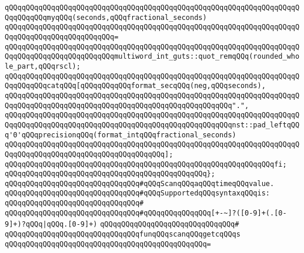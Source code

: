 \newline
\verb|qQQqqQQqqQQqqQQqqQQqqQQqqQQqqQQqqQQqqQQqqQQqqQQqqQQqqQQqqQQqqQQqqQQqqQQqqQQqqQQqmyqQQq(seconds,qQQqfractional_seconds)|\newline
\verb|qQQqqQQqqQQqqQQqqQQqqQQqqQQqqQQqqQQqqQQqqQQqqQQqqQQqqQQqqQQqqQQqqQQqqQQqqQQqqQQqqQQqqQQqqQQqqQQq=|\newline
\verb|qQQqqQQqqQQqqQQqqQQqqQQqqQQqqQQqqQQqqQQqqQQqqQQqqQQqqQQqqQQqqQQqqQQqqQQqqQQqqQQqqQQqqQQqqQQqqQQqmultiword_int_guts::quot_remqQQq(rounded_whole_part,qQQqrscl);|\newline
\newline
\verb|qQQqqQQqqQQqqQQqqQQqqQQqqQQqqQQqqQQqqQQqqQQqqQQqqQQqqQQqqQQqqQQqqQQqqQQqqQQqqQQqcatqQQq[qQQqqQQqqQQqformat_secqQQq(neg,qQQqseconds),|\newline
\verb|qQQqqQQqqQQqqQQqqQQqqQQqqQQqqQQqqQQqqQQqqQQqqQQqqQQqqQQqqQQqqQQqqQQqqQQqqQQqqQQqqQQqqQQqqQQqqQQqqQQqqQQqqQQqqQQqqQQqqQQqqQQq".",|\newline
\verb|qQQqqQQqqQQqqQQqqQQqqQQqqQQqqQQqqQQqqQQqqQQqqQQqqQQqqQQqqQQqqQQqqQQqqQQqqQQqqQQqqQQqqQQqqQQqqQQqqQQqqQQqqQQqqQQqqQQqqQQqqQQqnst::pad_leftqQQq'0'qQQqprecisionqQQq(format_intqQQqfractional_seconds)|\newline
\verb|qQQqqQQqqQQqqQQqqQQqqQQqqQQqqQQqqQQqqQQqqQQqqQQqqQQqqQQqqQQqqQQqqQQqqQQqqQQqqQQqqQQqqQQqqQQqqQQqqQQqqQQqqQQq];|\newline
\verb|qQQqqQQqqQQqqQQqqQQqqQQqqQQqqQQqqQQqqQQqqQQqqQQqqQQqqQQqqQQqqQQqfi;|\newline
\newline
\verb|qQQqqQQqqQQqqQQqqQQqqQQqqQQqqQQqqQQqqQQqqQQqqQQq};|\newline
\newline
\newline
\newline
\verb|qQQqqQQqqQQqqQQqqQQqqQQqqQQqqQQq#qQQqScanqQQqaqQQqtimeqQQqvalue.|\newline
\verb|qQQqqQQqqQQqqQQqqQQqqQQqqQQqqQQq#qQQqSupportedqQQqsyntaxqQQqis:|\newline
\verb|qQQqqQQqqQQqqQQqqQQqqQQqqQQqqQQq#|\newline
\verb|qQQqqQQqqQQqqQQqqQQqqQQqqQQqqQQq#qQQqqQQqqQQqqQQq[+-~]?([0-9]+(.[0-9]+)?qQQq|\verb#|qQQq.[0-9]+)#\newline
\verb|qQQqqQQqqQQqqQQqqQQqqQQqqQQqqQQq#|\newline
\verb|qQQqqQQqqQQqqQQqqQQqqQQqqQQqqQQqfunqQQqscanqQQqgetcqQQqs|\newline
\verb|qQQqqQQqqQQqqQQqqQQqqQQqqQQqqQQqqQQqqQQqqQQqqQQq=|\newline
